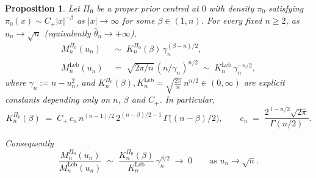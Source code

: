 \documentclass[numsec,webpdf,modern,medium,namedate]{oup-authoring-template}
\theoremstyle{thmstyleone}%
\newtheorem{proposition}[theorem]{Proposition}%
\theoremstyle{thmstyletwo}%
\theoremstyle{thmstylethree}%
\newcommand{\Leb}{\mathrm{Leb}}
\newcommand{\1}{\mathbf{1}}
\begin{document}
\begin{proposition}\label{prop:rate-mismatch}
Let \(\Pi_0\) be a proper prior centred at \(0\) with density
\(\pi_0\) satisfying
\(\pi_0(x)\sim C_+|x|^{-\beta}\) as \(|x|\to\infty\)
for some \(\beta\in(1,n)\). For every fixed \(n\geq 2\), as
\(u_n\to\sqrt n\) (equivalently \(\widehat\theta_n\to+\infty\)),
\begin{align}
   M_n^{\Pi_0}(u_n) &\;\sim\;
       K_n^{\Pi_0}(\beta)\,\gamma_n^{(\beta-n)/2},
       \label{eq:Mn-rate}\\[2pt]
   M_n^{\Leb}(u_n) &\;=\;
       \sqrt{2\pi/n}\,(n/\gamma_n)^{n/2}
       \;\sim\;K_n^{\Leb}\,\gamma_n^{-n/2},
       \label{eq:Mleb-rate}
\end{align}
where \(\gamma_n:=n-u_n^2\), and
\(K_n^{\Pi_0}(\beta), K_n^{\Leb} = \sqrt{\frac{2\pi}{n}} \, n^{n/2} \in(0,\infty)\) are explicit
constants depending only on \(n\), \(\beta\) and \(C_+\). In
particular,
\[
  K_n^{\Pi_0}(\beta) \;=\; C_+\, c_n\, n^{(n-1)/2}\, 2^{(n-\beta)/2-1}\, 
\Gamma\!\bigl((n-\beta)/2\bigr),
\qquad
c_n \;=\; \frac{2^{\,1-n/2}\sqrt{2\pi}}{\Gamma(n/2)}.
\]

Consequently
\begin{equation}\label{eq:rate-mismatch}
   \frac{M_n^{\Pi_0}(u_n)}{M_n^{\Leb}(u_n)}
   \;\sim\;\frac{K_n^{\Pi_0}(\beta)}{K_n^{\Leb}}\,\gamma_n^{\beta/2}
   \;\longrightarrow\;0\qquad\text{as }u_n\to\sqrt n.
\end{equation}
\end{proposition}
\end{document}
